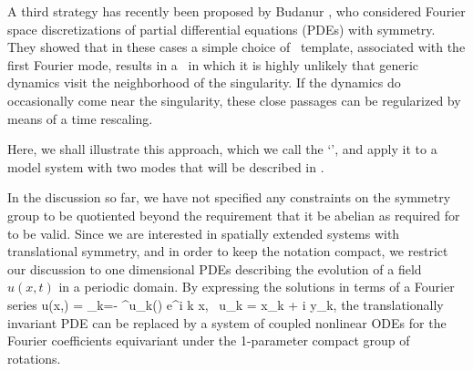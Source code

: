 A third strategy has recently been proposed by Budanur
\etal{}, who considered Fourier space discretizations of
partial differential equations (PDEs) with  symmetry. They showed
that in these cases a simple choice of \slice\ template, associated with
the first Fourier mode, results in a \slice\ in which it is highly
unlikely that generic dynamics visit the neighborhood of the singularity.
If the dynamics do occasionally come near the singularity, these close
passages can be regularized by means of a time rescaling.

Here, we shall illustrate this approach, which we call the
`\fFslice', and apply it to a model system with two modes that will be
described in .

In the discussion so far, we have not specified any constraints on the symmetry group
to be quotiented beyond the requirement that it be abelian as required for 
to be valid. Since we are interested in spatially extended systems with
translational symmetry, and in order to keep the notation compact,
we restrict our discussion to one dimensional PDEs describing
the evolution of a field $u(x,t)$ in a periodic domain.
By expressing the solutions in terms of a Fourier series
\beq
   u(x,\zeit) = \sum\limits_{k=- \infty}^\infty u_k\left(\zeit\right) e^{i k x}, \,\,\,u_k = x_k + i y_k,
the translationally invariant PDE can be replaced by a system of coupled nonlinear
ODEs for the Fourier coefficients equivariant under the 1-parameter compact group of  rotations.

